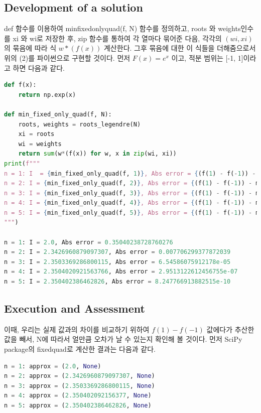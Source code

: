 \documentclass[11pt]{article}
\begin{document}
\subsection{Development of a solution} 
def 함수를 이용하여 min\textunderscore fixed\textunderscore only\textunderscore quad(f, N) 함수를 정의하고, roots 와 weights인수를 xi 와 wi로 저장한 후, zip 함수를 통하여 각 열마다 묶어준 다음, 각각의 $(wi, xi)$ 의 묶음에 따라 식 $w * (f(x))$ 계산한다. 그후 묶음에 대한 이 식들을 더해줌으로서 위의 (2)를 파이썬으로 구현할 것이다. 먼저 $F(x) = e^x$ 이고, 적분 범위는 [-1, 1]이라고 하면 다음과 같다.

\begin{lstlisting}[language=Python]
def f(x):
    return np.exp(x)
    
def min_fixed_only_quad(f, N):
    roots, weights = roots_legendre(N)
    xi = roots
    wi = weights
    return sum(w*(f(x)) for w, x in zip(wi, xi))
print(f"""
n = 1: I  = {min_fixed_only_quad(f, 1)}, Abs error = {(f(1) - f(-1)) - min_fixed_only_quad(f, 1)}
n = 2: I = {min_fixed_only_quad(f, 2)}, Abs error = {(f(1) - f(-1)) - min_fixed_only_quad(f, 2)}
n = 3: I = {min_fixed_only_quad(f, 3)}, Abs error = {(f(1) - f(-1)) - min_fixed_only_quad(f, 3)}
n = 4: I = {min_fixed_only_quad(f, 4)}, Abs error = {(f(1) - f(-1)) - min_fixed_only_quad(f, 4)}
n = 5: I = {min_fixed_only_quad(f, 5)}, Abs error = {(f(1) - f(-1)) - min_fixed_only_quad(f, 5)}
""")

n = 1: I = 2.0, Abs error = 0.35040238728760276
n = 2: I = 2.3426960879097307, Abs error = 0.007706299377872039
n = 3: I = 2.3503369286800115, Abs error = 6.54586075912178e-05
n = 4: I = 2.3504020921563766, Abs error = 2.9513122612456755e-07
n = 5: I = 2.350402386462826, Abs error = 8.247766913882515e-10
\end{lstlisting}

\subsection{Execution and Assessment} 
이때, 우리는 실제 값과의 차이를 비교하기 위하여 $f(1) - f(-1)$ 값에다가 추산한 값을 빼서, N에 따라서 얼만큼 오차가 날 수 있는지 확인해 볼 것이다. 먼저 SciPy package의 fixed\textunderscore quad로 계산한 결과는 다음과 같다.
\begin{lstlisting}[language=Python]
n = 1: approx = (2.0, None)
n = 2: approx = (2.3426960879097307, None)
n = 3: approx = (2.3503369286800115, None)
n = 4: approx = (2.350402092156377, None)
n = 5: approx = (2.350402386462826, None)
\end{lstlisting}
\end{document}
